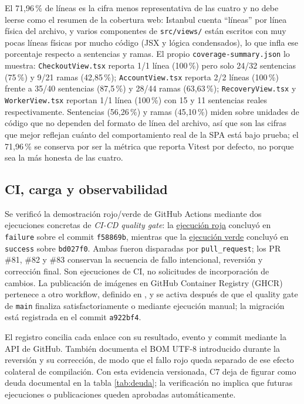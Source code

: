 \documentclass[12pt,a4paper]{article}
\begin{document}
El 71,96\,\% de líneas es la cifra menos representativa de las cuatro y no
debe leerse como el resumen de la cobertura web: Istanbul cuenta ``líneas''
por línea física del archivo, y varios componentes de \texttt{src/views/}
están escritos con muy pocas líneas físicas por mucho código (JSX y lógica
condensados), lo que infla ese porcentaje respecto a sentencias y ramas. El
propio \texttt{coverage-summary.json} lo muestra: \texttt{CheckoutView.tsx}
reporta 1/1 línea (100\,\%) pero solo 24/32 sentencias (75\,\%) y 9/21 ramas
(42,85\,\%); \texttt{AccountView.tsx} reporta 2/2 líneas (100\,\%) frente a
35/40 sentencias (87,5\,\%) y 28/44 ramas (63,63\,\%); \texttt{RecoveryView.tsx}
y \texttt{WorkerView.tsx} reportan 1/1 línea (100\,\%) con 15 y 11 sentencias
reales respectivamente. Sentencias (56,26\,\%) y ramas (45,10\,\%) miden sobre
unidades de código que no dependen del formato de línea del archivo, así que
son las cifras que mejor reflejan cuánto del comportamiento real de la SPA
está bajo prueba; el 71,96\,\% se conserva por ser la métrica que reporta
Vitest por defecto, no porque sea la más honesta de las cuatro.


\subsection{CI, carga y observabilidad}
Se verificó la demostración rojo/verde de GitHub Actions mediante dos ejecuciones concretas de \emph{CI-CD quality gate}: la \href{https://github.com/JoseLozanoMorales/TiendaTech/actions/runs/33554959074}{ejecución roja} concluyó en \texttt{failure} sobre el commit \texttt{f58869b}, mientras que la \href{https://github.com/JoseLozanoMorales/TiendaTech/actions/runs/33557738789}{ejecución verde} concluyó en \texttt{success} sobre \texttt{bd027f0}. Ambas fueron disparadas por \texttt{pull\_request}; los PR \#81, \#82 y \#83 conservan la secuencia de fallo intencional, reversión y corrección final. Son ejecuciones de CI, no solicitudes de incorporación de cambios. La publicación de imágenes en GitHub Container Registry (GHCR) pertenece a otro workflow, definido en , y se activa después de que el quality gate de \texttt{main} finaliza satisfactoriamente o mediante ejecución manual; la migración está registrada en el commit \texttt{a922bf4}.

El registro  concilia cada enlace con su resultado, evento y commit mediante la API de GitHub. También documenta el BOM UTF-8 introducido durante la reversión y su corrección, de modo que el fallo rojo queda separado de ese efecto colateral de compilación. Con esta evidencia versionada, C7 deja de figurar como deuda documental en la tabla \ref{tab:deuda}; la verificación no implica que futuras ejecuciones o publicaciones queden aprobadas automáticamente.
\end{document}
